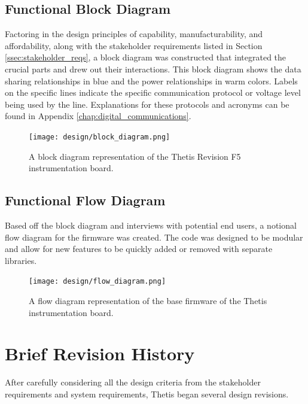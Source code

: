 

\subsection{Functional Block Diagram} 
Factoring in the design principles of capability, manufacturability, and affordability, along with the stakeholder requirements listed in Section \ref{ssec:stakeholder_reqs}, a block diagram was constructed that integrated the crucial parts and drew out their interactions.
This block diagram shows the data sharing relationships in blue and the power relationships in warm colors.
Labels on the specific lines indicate the specific communication protocol or voltage level being used by the line.
Explanations for these protocols and acronyms can be found in Appendix \ref{chap:digital_communications}.

\begin{figure}[h!]
	\centering
	\texttt{[image: design/block\_diagram.png]}
	\caption[Thetis RevF5 block diagram]{A block diagram representation of the Thetis Revision F5 instrumentation board.}
\end{figure}

\subsection{Functional Flow Diagram} 
Based off the block diagram and interviews with potential end users, a notional flow diagram for the firmware was created.
The code was designed to be modular and allow for new features to be quickly added or removed with separate libraries.

\begin{figure}[h!]
	\centering
	\texttt{[image: design/flow\_diagram.png]}
	\caption[Base Firmware flow diagram]{A flow diagram representation of the base firmware of the Thetis instrumentation board.}
\end{figure}

\section{Brief Revision History} 

After carefully considering all the design criteria from the stakeholder requirements and system requirements, Thetis began several design revisions.


